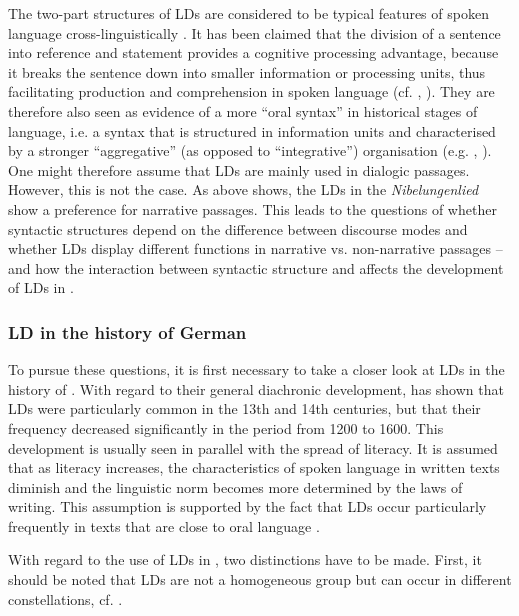 \documentclass[output=paper,colorlinks,citecolor=brown]{langscibook}
\begin{document}
The two-part structures of LDs are considered to be typical features of spoken language cross-linguistically \citep[67]{Chafe1994}. It has been claimed that the division of a sentence into reference and statement provides a cognitive processing advantage, because it breaks the sentence down into smaller information or processing units, thus facilitating production and comprehension in spoken language (cf. \citealt[39]{Lötscher1994}, \citealt[§ 2015]{Fiehler2009}). They are therefore also seen as evidence of a more “oral syntax” in historical stages of language, i.e. a syntax that is structured in information units and characterised by a stronger “aggregative” (as opposed to “integrative”) organisation (e.g. \citealt[48]{Lötscher1994}, \citealt{ÁgelHennig2006}). One might therefore assume that LDs are mainly used in dialogic passages. However, this is not the case. As  above shows, the LDs in the \textit{Nibelungenlied} show a preference for narrative passages. This leads to the questions of whether syntactic structures depend on the difference between discourse modes and whether LDs display different functions in narrative vs. non-narrative passages – and how the interaction between syntactic structure and  affects the development of LDs in . 


\subsubsection{LD in the history of German}\label{sec:zeman:3.1.1}
To pursue these questions, it is first necessary to take a closer look at LDs in the history of . With regard to their general diachronic development, \citet[42]{Lötscher1994} has shown that LDs were particularly common in the 13th and 14th centuries, but that their frequency decreased significantly in the period from 1200 to 1600. This development is usually seen in parallel with the spread of literacy. It is assumed that as literacy increases, the characteristics of spoken language in written texts diminish and the linguistic norm becomes more determined by the laws of writing. This assumption is supported by the fact that LDs occur particularly frequently in texts that are close to oral language \citep[48]{Lötscher1994}.

With regard to the use of LDs in , two distinctions have to be made. First, it should be noted that LDs are not a homogeneous group but can occur in different constellations, cf. . 
\end{document}
